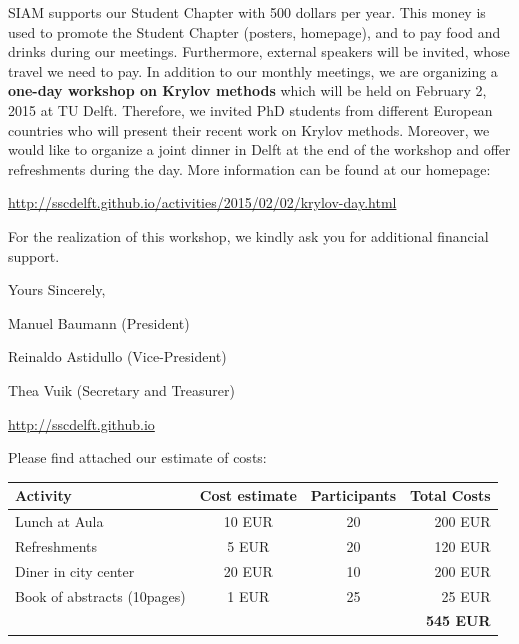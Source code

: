 \documentclass[a4paper,10pt]{article}
\begin{document}
\bigskip
SIAM supports our Student Chapter with 500 dollars per year. This money is used to promote the Student Chapter (posters, homepage), and to pay food and drinks during our meetings. Furthermore, external speakers will be invited, whose travel we need to pay. In addition to our monthly meetings, we are organizing a \textbf{one-day workshop on Krylov methods} which will be held on February 2, 2015 at TU Delft. Therefore, we invited PhD students from different European countries who will present their recent work on Krylov methods. Moreover, we would like to organize a joint dinner in Delft at the end of the workshop and offer refreshments during the day. More information can be found at our homepage:
\begin{center}
 \url{http://sscdelft.github.io/activities/2015/02/02/krylov-day.html}
\end{center}



\bigskip
\noindent For the realization of this workshop, we kindly ask you for additional financial support.

\bigskip
\noindent Yours Sincerely,

\bigskip 
\bigskip

\noindent Manuel Baumann (President)

\noindent Reinaldo Astidullo (Vice-President)

\noindent Thea Vuik (Secretary and Treasurer)

\noindent \url{http://sscdelft.github.io}

\newpage
Please find attached our estimate of costs:
\begin{table}[h]
\centering
\begin{tabular}{lccr}
 Activity & Cost estimate & Participants & Total Costs  \\
 \hline
 Lunch at Aula & 10 EUR  & 20  & 200 EUR   \\
 Refreshments & 5 EUR & 20 & 120 EUR \\
 Diner in city center & 20 EUR & 10  & 200 EUR   \\
 Book of abstracts (10pages)& 1 EUR  & 25 & 25 EUR \\
 & & & \textbf{545 EUR}
\end{tabular}
\end{table}
\end{document}
